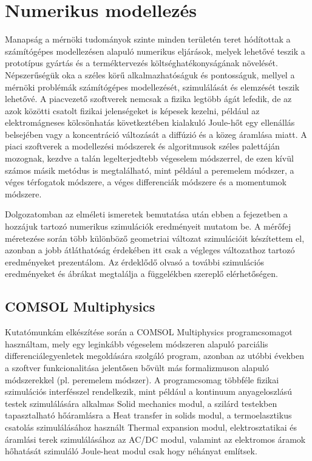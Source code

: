 \chapter{Numerikus modellezés}
\label{chap:numerical}

Manapság a mérnöki tudományok szinte minden területén teret hódítottak a számítógépes modellezésen alapuló numerikus eljárások, melyek lehetővé teszik a prototípus gyártás és a terméktervezés költséghatékonyságának növelését. Népszerűségük oka a széles körű alkalmazhatóságuk és pontosságuk, mellyel a mérnöki problémák számítógépes modellezését, szimulálását és elemzését teszik lehetővé. A piacvezető szoftverek nemcsak a fizika legtöbb ágát lefedik, de az azok közötti csatolt fizikai jelenségeket is képesek kezelni, például az elektromágneses kölcsönhatás következtében kialakuló Joule-hőt egy ellenállás belsejében vagy a koncentráció változását a diffúzió és a közeg áramlása miatt. A piaci szoftverek a modellezési módszerek és algoritmusok széles palettáján mozognak, kezdve a talán legelterjedtebb végeselem módszerrel, de ezen kívül számos másik metódus is megtalálható, mint például a peremelem módszer\cite{bem}, a véges térfogatok módszere\cite{fvm}, a véges differenciák módszere\cite{fdm} és a momentumok módszere\cite{moment_method}.

Dolgozatomban az elméleti ismeretek bemutatása után ebben a fejezetben a hozzájuk tartozó numerikus szimulációk eredményeit mutatom be. A mérőfej méretezése során több különböző geometriai változat szimulációit készítettem el, azonban a jobb átláthatóság érdekében itt csak a végleges változathoz tartozó eredményeket prezentálom. Az érdeklődő olvasó a további szimulációs eredményeket és ábrákat megtalálja a függelékben szereplő elérhetőségen.

\section{COMSOL Multiphysics}

Kutatómunkám elkészítése során a COMSOL Multiphysics\cite{comsol} programcsomagot használtam, mely egy leginkább végeselem módszeren alapuló parciális differenciálegyenletek megoldására szolgáló program, azonban az utóbbi években a szoftver funkcionalitása jelentősen bővült más formalizmuson alapuló módszerekkel (pl. peremelem módszer). A programcsomag  többféle fizikai szimulációs interfésszel rendelkezik, mint például a kontinuum anyageloszlású testek szimulálására alkalmas Solid mechanics modul, a szilárd testekben tapasztalható hőáramlásra a Heat transfer in solids modul, a termoelasztikus csatolás szimulálásához használt Thermal expansion modul, elektrosztatikai és áramlási terek szimulálásához az AC/DC modul, valamint az elektromos áramok hőhatását szimuláló Joule-heat modul csak hogy néhányat említsek.

